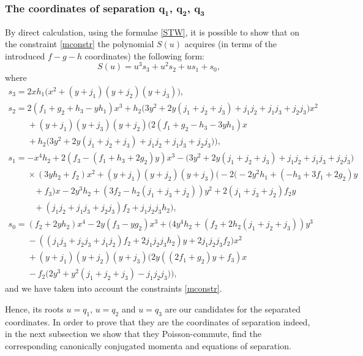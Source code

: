 \documentclass[pdftex]{sigma}
\numberwithin{equation}{section}
\begin{document}
\subsubsection[The coordinates of separation q\_1, q\_2, q\_3]{The coordinates of separation $\boldsymbol{q_1}$, $\boldsymbol{q_2}$, $\boldsymbol{q_3}$}
By direct calculation, using the formulae \eqref{STW}, it is possible to show that on the constraint \eqref{mconstr} the polynomial $S(u)$ acquires (in terms of the introduced $f-g-h$ coordinates) the following form:
\begin{equation}\label{Su}
S(u)= u^3 s_3+ u^2 s_2+ u s_1+ s_0,
\end{equation}
where
\begin{subequations}\label{Si}
\begin{gather}
s_3= 2 x h_1\bigl(x^2+(y+j_1)(y+j_2)(y+j_3)\bigr),
\\
s_2= 2(f_1+g_2+h_3 -y h_1) x^3 + h_2 \big(3 y^2+2 y (j_1+j_2+j_3)+j_1 j_2+j_1 j_3+j_2 j_3\big) x^2 \nonumber\\
\phantom{s_2=}{}+
 (y+j_1)(y+j_3)(y+j_2)\big(2(f_1+g_2-h_3-3 y h_1)x \nonumber\\
\phantom{s_2=}{}+ h_2\big(3y^2+2y (j_1+j_2+j_3)+j_1 j_2+j_1j_3+j_2j_3\big)\big),
\\
s_1= -x^4 h_2+2( f_3 -(f_1+ h_3+2 g_2)y) x^3- \big(3 y^2+2 y (j_1+j_2+j_3)+j_1 j_2+j_1 j_3+j_2 j_3\big)\nonumber
\\
\phantom{s_1=}{}\times(3 y h_2+f_2) x^2+(y+j_1) (y+j_2) (y+j_3)
\bigl(-2\big(-2y^2 h_1+(-h_3+3f_1+2g_2)y\nonumber
\\
\phantom{s_1=\times}{}+f_3 \big)x -2y^3h_2+(3f_2-h_2(j_1+j_3+j_2))y^2
+2(j_1+j_3+j_2)f_2y\nonumber
\\
\phantom{s_1=\times}{}+(j_1j_2+j_1j_3+j_2j_3)f_2+j_1 j_2 j_3 h_2\bigr),
\\
s_0= (f_2+2 y h_2) x^4-2 y (f_3-y g_2) x^3+ \bigl( 4y^4 h_2+(f_2+2h_2(j_1+j_2+j_3))y^3\nonumber
\\
\phantom{s_1=}{} -((j_1j_3+j_2j_3+j_1j_2)f_2
+2j_1j_2j_3 h_2)y+2j_1j_2j_3 f_2\bigr) x^2\nonumber
\\
\phantom{s_1=}{} + (y+j_1)(y+j_2)(y+j_3)\bigl(2 y((2f_1+g_2) y +f_3)x \nonumber
\\
\phantom{s_1=}{}
 -f_2 \big(2 y^3+y^2( j_1+j_2+j_3)-j_1 j_2 j_3\big)\bigr),
\end{gather}
\end{subequations}
and we have taken into account the constraints \eqref{mconstr}.


Hence, its roots $u=q_1$, $u=q_2$ and $u=q_3$
are our candidates for the separated coordinates. In order to prove that they are the coordinates of separation indeed, in the next subsection we show that they Poisson-commute, find the corresponding canonically conjugated momenta and equations of separation.
\end{document}
